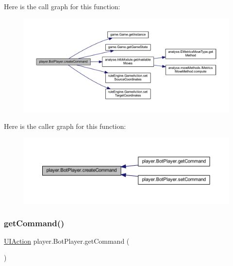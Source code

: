 Here is the call graph for this function\+:
\nopagebreak
\begin{figure}[H]
\begin{center}
\leavevmode
\includegraphics[width=350pt]{classplayer_1_1_bot_player_abb2afb9c7bd26eb9c4f6a586a8164230_cgraph}
\end{center}
\end{figure}
Here is the caller graph for this function\+:
\nopagebreak
\begin{figure}[H]
\begin{center}
\leavevmode
\includegraphics[width=350pt]{classplayer_1_1_bot_player_abb2afb9c7bd26eb9c4f6a586a8164230_icgraph}
\end{center}
\end{figure}
\mbox{\label{classplayer_1_1_bot_player_a811ae631a057c586488b32badd752f3c}} 
\subsubsection{\texorpdfstring{get\+Command()}{getCommand()}}
{\footnotesize\ttfamily \mbox{\hyperlink{classui_1_1_u_i_action}{U\+I\+Action}} player.\+Bot\+Player.\+get\+Command (\begin{DoxyParamCaption}{ }\end{DoxyParamCaption})\hspace{0.3cm}{\ttfamily [inline]}}



